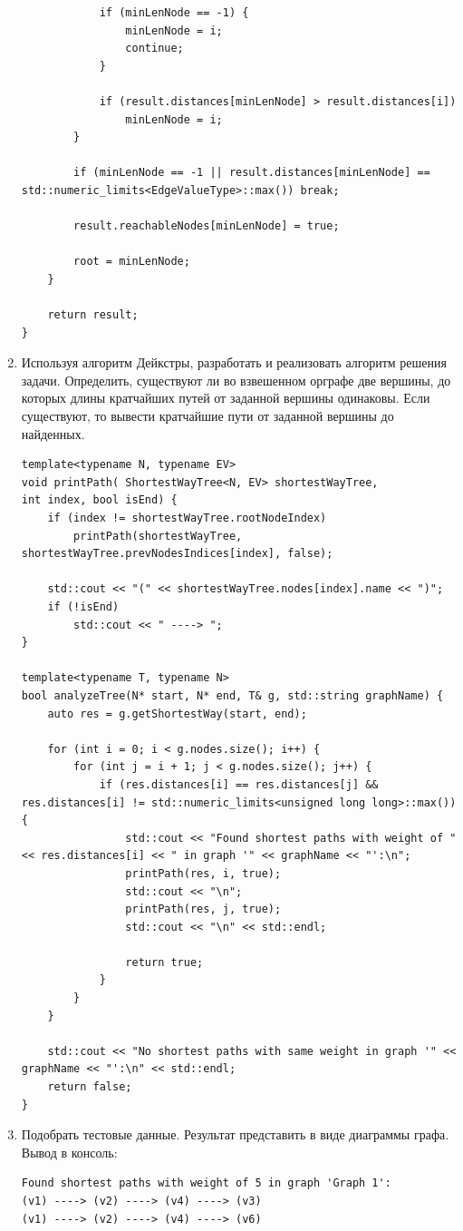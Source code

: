 \documentclass[a4paper,14pt]{extarticle}
\begin{document}
\begin{enumerate}[1.]
\begin{verbatim}
            if (minLenNode == -1) {
                minLenNode = i;
                continue;
            }

            if (result.distances[minLenNode] > result.distances[i])
                minLenNode = i;
        }

        if (minLenNode == -1 || result.distances[minLenNode] == std::numeric_limits<EdgeValueType>::max()) break;

        result.reachableNodes[minLenNode] = true;

        root = minLenNode;
    }  

    return result;
}
        \end{verbatim}
        \item Используя алгоритм Дейкстры, разработать и реализовать алгоритм решения задачи.\bigbreak
        Определить, существуют ли во взвешенном орграфе две вершины, до которых длины 
        кратчайших путей от заданной вершины одинаковы. Если существуют, то вывести 
        кратчайшие пути от заданной вершины до найденных.\\
        \begin{verbatim}
template<typename N, typename EV>
void printPath( ShortestWayTree<N, EV> shortestWayTree, 
int index, bool isEnd) {
    if (index != shortestWayTree.rootNodeIndex)
        printPath(shortestWayTree, shortestWayTree.prevNodesIndices[index], false);

    std::cout << "(" << shortestWayTree.nodes[index].name << ")";
    if (!isEnd)
        std::cout << " ----> ";
}

template<typename T, typename N>
bool analyzeTree(N* start, N* end, T& g, std::string graphName) {
    auto res = g.getShortestWay(start, end);
    
    for (int i = 0; i < g.nodes.size(); i++) {
        for (int j = i + 1; j < g.nodes.size(); j++) {
            if (res.distances[i] == res.distances[j] && res.distances[i] != std::numeric_limits<unsigned long long>::max()) {
                std::cout << "Found shortest paths with weight of " << res.distances[i] << " in graph '" << graphName << "':\n";
                printPath(res, i, true);
                std::cout << "\n";
                printPath(res, j, true);
                std::cout << "\n" << std::endl;

                return true;
            }
        }
    }

    std::cout << "No shortest paths with same weight in graph '" << graphName << "':\n" << std::endl;
    return false;
}
        \end{verbatim}
        \item Подобрать тестовые данные. Результат представить в виде диаграммы графа.\\
        Вывод в консоль:
                    \begin{verbatim}
Found shortest paths with weight of 5 in graph 'Graph 1':
(v1) ----> (v2) ----> (v4) ----> (v3)
(v1) ----> (v2) ----> (v4) ----> (v6)


\end{verbatim}
\end{enumerate}
\end{document}
